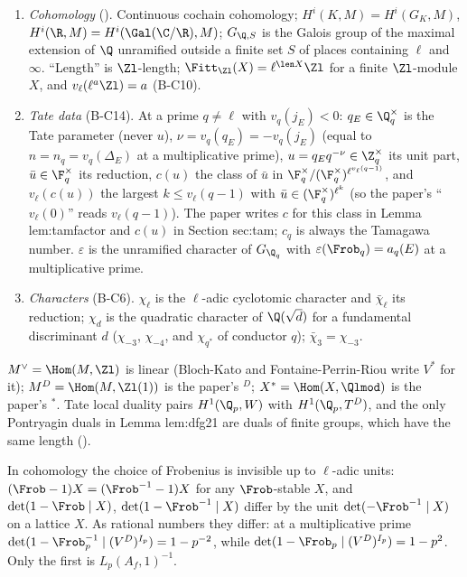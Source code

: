 \begin{convention}
\begin{enumerate}[label=(\alph*)]
is $+1$; so $V_\ell E$ has weights $\{0,1\}$, $A_f$ has $\{-1,0,1\}$ and $V^D=A_f(1)$ has $\{0,1,2\}$. Every formula below that depends on this
sign says so.
\item \emph{Cohomology} (). Continuous cochain cohomology; $H^i(K,M)=H^i(G_K,M)$, $H^i(\R,M)=H^i(\Gal(\C/\R),M)$;
$G_{\Q,S}$ is the Galois group of the maximal extension of $\Q$ unramified outside a finite set $S$ of places containing $\ell$ and
$\infty$. ``Length'' is $\Zl$-length; $\Fitt_{\Zl}(X)=\ell^{\len X}\Zl$ for a finite $\Zl$-module $X$, and $v_\ell(\ell^a\Zl)=a$ (B-C10).
\item \emph{Tate data} (B-C14). At a prime $q\ne\ell$ with $v_q(j_E)<0$: $q_E\in\Q_q^\times$ is the Tate parameter (never $u$), $\nu=v_q(q_E)=-v_q(j_E)$
(equal to $n=n_q=v_q(\Delta_E)$ at a multiplicative prime), $u=q_Eq^{-\nu}\in\Z_q^\times$ its unit part, $\bar u\in\F_q^\times$ its reduction, $c(u)$ the
class of $\bar u$ in $\F_q^\times/(\F_q^\times)^{\ell^{v_\ell(q-1)}}$, and $v_\ell(c(u))$ the largest $k\le v_\ell(q-1)$ with $\bar u\in(\F_q^\times)^{\ell^k}$ (so the paper's
``$v_\ell(0)$'' reads $v_\ell(q-1)$). The paper writes $c$ for this class in Lemma lem:tamfactor and $c(u)$ in Section sec:tam; $c_q$ is always the
Tamagawa number. $\varepsilon$ is the unramified character of $G_{\Q_q}$ with $\varepsilon(\Frob_q)=a_q(E)$ at a multiplicative prime.
\item \emph{Characters} (B-C6). $\chi_\ell$ is the $\ell$-adic cyclotomic character and $\bar\chi_\ell$ its reduction; $\chi_d$ is the quadratic character
of $\Q(\sqrt d)$ for a fundamental discriminant $d$ ($\chi_{-3}$, $\chi_{-4}$, and $\chi_{q^*}$ of conductor $q$); $\bar\chi_3=\chi_{-3}$.
\end{enumerate}
\end{convention}

\begin{warning}\label{warn:blochkato:three-duals}
$M^\vee=\Hom(M,\Zl)$ is linear (Bloch-Kato and Fontaine-Perrin-Riou write $V^*$ for it); $M^D=\Hom(M,\Zl(1))$ is the paper's ${}^D$; $X^*=\Hom(X,\Qlmod)$
is the paper's ${}^*$. Tate local duality pairs $H^1(\Q_p,W)$ with $H^1(\Q_p,T^D)$, and the only Pontryagin duals in Lemma lem:dfg21 are
duals of finite groups, which have the same length ().
\end{warning}

\begin{warning}\label{warn:blochkato:two-frobenii}
In cohomology the choice of Frobenius is invisible up to $\ell$-adic units: $(\Frob-1)X=(\Frob^{-1}-1)X$ for any $\Frob$-stable $X$, and
$\det(1-\Frob\mid X)$, $\det(1-\Frob^{-1}\mid X)$ differ by the unit $\det(-\Frob^{-1}\mid X)$ on a lattice $X$. As rational numbers they differ: at a
multiplicative prime $\det(1-\Frob_p^{-1}\mid(V^D)^{I_p})=1-p^{-2}$, while $\det(1-\Frob_p\mid(V^D)^{I_p})=1-p^2$. Only the first is $L_p(A_f,1)^{-1}$.
\end{warning}

